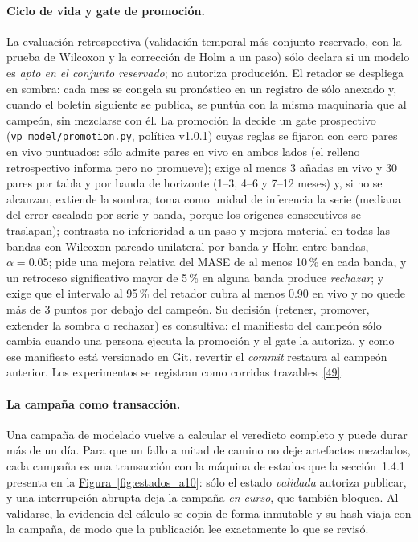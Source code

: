 \documentclass[12pt,letterpaper]{report}
\newcommand{\cita}[1]{\hyperref[bib:#1]{[#1]}}
\begin{document}
\paragraph{Ciclo de vida y gate de promoción.} La evaluación retrospectiva (validación temporal
más conjunto reservado, con la prueba de Wilcoxon y la corrección de Holm a un paso) sólo declara
si un modelo es \textit{apto en el conjunto reservado}; no autoriza producción. El retador se
despliega en sombra: cada mes se congela su pronóstico en un registro de sólo anexado y, cuando el
boletín siguiente se publica, se puntúa con la misma maquinaria que al campeón, sin mezclarse con
él. La promoción la decide un gate prospectivo (\texttt{vp\_model/promotion.py}, política v1.0.1)
cuyas reglas se fijaron con cero pares en vivo puntuados: sólo admite pares en vivo en ambos lados
(el relleno retrospectivo informa pero no promueve); exige al menos 3 añadas en vivo y 30 pares
por tabla y por banda de horizonte (1--3, 4--6 y 7--12 meses) y, si no se alcanzan, extiende la
sombra; toma como unidad de inferencia la serie (mediana del error escalado por serie y banda,
porque los orígenes consecutivos se traslapan); contrasta no inferioridad a un paso y mejora
material en todas las bandas con Wilcoxon pareado unilateral por banda y Holm entre bandas,
$\alpha = 0.05$; pide una mejora relativa del MASE de al menos 10\,\% en cada banda, y un
retroceso significativo mayor de 5\,\% en alguna banda produce \textit{rechazar}; y exige que el
intervalo al 95\,\% del retador cubra al menos 0.90 en vivo y no quede más de 3 puntos por debajo
del campeón. Su decisión (retener, promover, extender la sombra o rechazar) es consultiva: el
manifiesto del campeón sólo cambia cuando una persona ejecuta la promoción y el gate la autoriza,
y como ese manifiesto está versionado en Git, revertir el \textit{commit} restaura al campeón
anterior. Los experimentos se registran como corridas trazables~\cita{49}.

\paragraph{La campaña como transacción.} Una campaña de modelado vuelve a calcular el veredicto
completo y puede durar más de un día. Para que un fallo a mitad de camino no deje artefactos
mezclados, cada campaña es una transacción con la máquina de estados que la sección~1.4.1
presenta en la \hyperref[fig:estados_a10]{Figura~\ref*{fig:estados_a10}}: sólo el estado \textit{validada} autoriza publicar, y
una interrupción abrupta deja la campaña \textit{en curso}, que también bloquea. Al validarse, la
evidencia del cálculo se copia de forma inmutable y su hash viaja con la campaña, de modo que la
publicación lee exactamente lo que se revisó.
\end{document}
